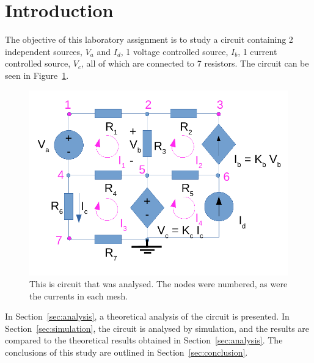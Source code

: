 \section{Introduction}
\label{sec:introduction}

The objective of this laboratory assignment is to study a circuit containing 2 independent sources, $V_a$ and $I_d$, 1 voltage controlled source, $I_b$, 1 current controlled source, $V_c$, all of which are connected to 7 resistors. The circuit can be seen in Figure~\ref{fig1}.

\begin{figure}[h] \centering
\includegraphics[width=0.4\linewidth]{t1-1.pdf}
\caption{This is circuit that was analysed. The nodes were numbered, as were the currents in each mesh.}
\label{fig1}
\end{figure}

In Section~\ref{sec:analysis}, a theoretical analysis of the circuit is
presented. In Section~\ref{sec:simulation}, the circuit is analysed by
simulation, and the results are compared to the theoretical results obtained in
Section~\ref{sec:analysis}. The conclusions of this study are outlined in
Section~\ref{sec:conclusion}.
